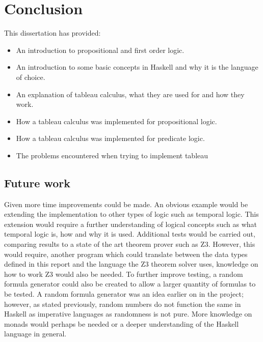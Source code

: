 \documentclass{article}%
\begin{document}
\section{Conclusion}
This dissertation has provided:
\begin{itemize}
\item An introduction to propositional and first order logic.
\item An introduction to some basic concepts in Haskell and why it is the language of choice. 
\item An explanation of tableau calculus, what they are used for and how they work. 
\item How a tableau calculus was implemented for propositional logic.
\item How a tableau calculus was implemented for predicate logic. 
\item The problems encountered when trying to implement tableau
\end{itemize}
\subsection{Future work}
Given more time improvements could be made. An obvious example would be extending the implementation to other types of logic such as temporal logic. This extension would require a further understanding of logical concepts such as what temporal logic is, how and why it is used. Additional tests would be carried out, comparing results to a state of the art theorem prover such as Z3. However, this would require, another program which could translate between the data types defined in this report and the language the Z3 theorem solver uses, knowledge on how to work Z3 would also be needed. To further improve testing, a random formula generator could also be created to allow a larger quantity of formulas to be tested. A random formula generator was an idea earlier on in the project; however, as stated previously, random numbers do not function the same in Haskell as imperative languages as randomness is not pure. More knowledge on monads would perhaps be needed or a deeper understanding of the Haskell language in general. 



\end{document}

